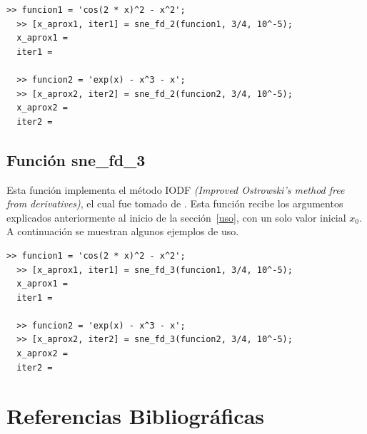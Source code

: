 \documentclass[12pt]{article}
\begin{document}
\begin{minipage}{\linewidth}
\begin{lstlisting}[frame = single]
  >> funcion1 = 'cos(2 * x)^2 - x^2';
  >> [x_aprox1, iter1] = sne_fd_2(funcion1, 3/4, 10^-5);
  x_aprox1 = 
  iter1 = 

  >> funcion2 = 'exp(x) - x^3 - x';
  >> [x_aprox2, iter2] = sne_fd_2(funcion2, 3/4, 10^-5);
  x_aprox2 = 
  iter2 = 

\end{lstlisting}
\end{minipage}

\subsection{Función sne\_fd\_3}
Esta función implementa el método IODF \textit{(Improved Ostrowski's method free from derivatives)}, el cual fue tomado de \cite{cordero2012steffensen}. Esta función recibe los argumentos explicados anteriormente al inicio de la sección~\ref{uso}, con un solo valor inicial $x_{0}$. A continuación se muestran algunos ejemplos de uso.

\begin{minipage}{\linewidth}
\begin{lstlisting}[frame = single]
  >> funcion1 = 'cos(2 * x)^2 - x^2';
  >> [x_aprox1, iter1] = sne_fd_3(funcion1, 3/4, 10^-5);
  x_aprox1 = 
  iter1 = 

  >> funcion2 = 'exp(x) - x^3 - x';
  >> [x_aprox2, iter2] = sne_fd_3(funcion2, 3/4, 10^-5);
  x_aprox2 = 
  iter2 = 

\end{lstlisting}
\end{minipage}

\newpage
\section{Referencias Bibliográficas}
\nocite{*}

\end{document}
